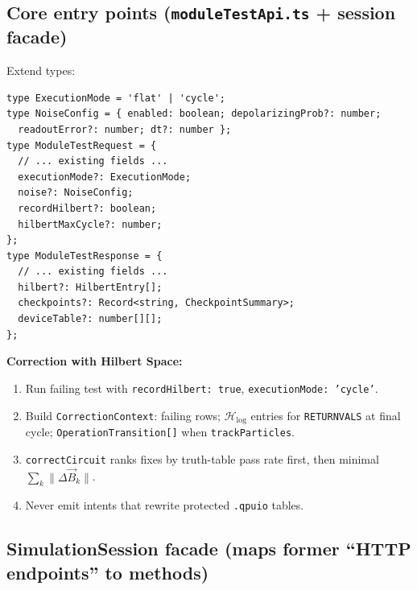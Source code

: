 \documentclass[11pt,a4paper]{article}
\newcommand{\HS}{\mathcal{H}_{\mathrm{log}}}
\begin{document}
\subsection{Core entry points (\texttt{moduleTestApi.ts} + session facade)}

Extend types:

\begin{lstlisting}[style=protocol]
type ExecutionMode = 'flat' | 'cycle';
type NoiseConfig = { enabled: boolean; depolarizingProb?: number;
  readoutError?: number; dt?: number };
type ModuleTestRequest = {
  // ... existing fields ...
  executionMode?: ExecutionMode;
  noise?: NoiseConfig;
  recordHilbert?: boolean;
  hilbertMaxCycle?: number;
};
type ModuleTestResponse = {
  // ... existing fields ...
  hilbert?: HilbertEntry[];
  checkpoints?: Record<string, CheckpointSummary>;
  deviceTable?: number[][];
};
\end{lstlisting}

\textbf{Correction with Hilbert Space:}
\begin{enumerate}
  \item Run failing test with \texttt{recordHilbert: true}, \texttt{executionMode: 'cycle'}.
  \item Build \texttt{CorrectionContext}: failing rows; $\HS$ entries for \texttt{RETURNVALS} at final cycle; \texttt{OperationTransition[]} when \texttt{trackParticles}.
  \item \texttt{correctCircuit} ranks fixes by truth-table pass rate first, then minimal $\sum_k \|\Delta\vec{B}_k\|$.
  \item Never emit intents that rewrite protected \texttt{.qpuio} tables.
\end{enumerate}

\subsection{SimulationSession facade (maps former ``HTTP endpoints'' to methods)}
\end{document}
